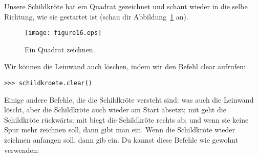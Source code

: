Unsere Schildkröte hat ein Quadrat gezeichnet und schaut wieder in die selbe Richtung, wie sie gestartet ist (schau dir Abbildung~\ref{fig16} an).

\begin{figure}
\begin{center}
\texttt{[image: figure16.eps]}
\end{center}
\caption{Ein Quadrat zeichnen.}\label{fig16}
\end{figure}

Wir können die Leinwand auch löschen, indem wir den Befehl clear aufrufen:

\begin{Verbatim}[frame=single]
>>> schildkroete.clear()
\end{Verbatim}

Einige andere Befehle, die die Schildkröte versteht sind:  was auch die Leinwand löscht, aber die Schildkröte auch wieder am Start absetzt; mit  geht die Schildkröte rückwärts; mit  biegt die Schildkröte rechts ab; und wenn sie keine Spur mehr zeichnen soll, dann gibt man  ein. Wenn die Schildkröte wieder zeichnen anfangen soll, dann gib  ein. Du kannst diese Befehle wie gewohnt verwenden:

